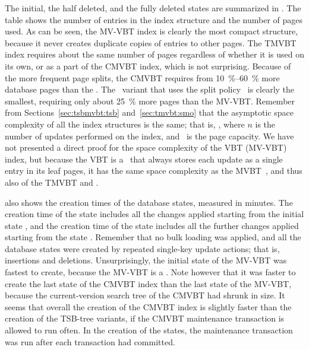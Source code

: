 The initial, the half deleted, and the fully deleted states are
summarized in . 
The table shows the number of entries in the index structure 
and the number of pages used.
As can be seen, the MV-VBT index is clearly the most compact structure,
because it never creates duplicate copies of entries to other pages.
The TMVBT index requires about the same number of pages regardless of whether
it is used on its own, or as a part of the CMVBT index, which is not
surprising.
Because of the more frequent page splits, the CMVBT requires from
\SIrange{10}{60}{\percent} more database pages than the \TSBtree.
The \TSBtree\ variant that uses the  split
policy~\cite{lomet:1990:tsb-performance} is clearly the smallest, requiring
only about \SI{25}{\percent} more pages than the MV-VBT\@.
Remember from Sections~\ref{sec:tsbmvbt:tsb} and~\ref{sec:tmvbt:smo} that the
asymptotic space complexity of all the index structures is the same; that is,
, where $n$ is the number of updates performed on the index, and
\capacity\ is the page capacity.
We have not presented a direct proof for the space complexity of the VBT
(MV-VBT) index, but because the VBT is a \Btree\ that always stores each update
as a single entry in its leaf pages, it has the same space complexity as the
MVBT~\cite{becker:1993:optimal,becker:1996:mvbt}, and thus also of the TMVBT
and \TSBtree.

 also shows the creation times of the database
states, measured in minutes.
The creation time of the state  includes all the changes applied
starting from the initial state , and the creation time of the
state  includes all the further changes applied starting from
the state .
Remember that no bulk loading was applied, and all the database states were
created by repeated single-key update actions; that is, insertions and
deletions.
Unsurprisingly, the initial state of the MV-VBT was fastest to create, because
the MV-VBT is a \Btree. 
Note however that it was faster to create the last state  of the
CMVBT index than the last state of the MV-VBT, because the current-version
search tree of the CMVBT had shrunk in size.
It seems that overall the creation of the CMVBT index is slightly faster than
the creation of the TSB-tree variants, if the CMVBT maintenance transaction is
allowed to run often. 
In the creation of the states, the maintenance transaction was run after each
transaction had committed.

